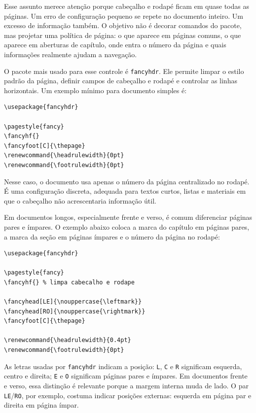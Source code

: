 Esse assunto merece atenção porque cabeçalho e rodapé ficam em quase todas as páginas. Um erro de configuração pequeno se repete no documento inteiro. Um excesso de informação também. O objetivo não é decorar comandos do pacote, mas projetar uma política de página: o que aparece em páginas comuns, o que aparece em aberturas de capítulo, onde entra o número da página e quais informações realmente ajudam a navegação.

O pacote mais usado para esse controle é \texttt{fancyhdr}. Ele permite limpar o estilo padrão da página, definir campos de cabeçalho e rodapé e controlar as linhas horizontais. Um exemplo mínimo para documento simples é:

\begin{lstlisting}[language={[latex]TeX}, caption={Rodapé simples com número de página}]
\usepackage{fancyhdr}

\pagestyle{fancy}
\fancyhf{}
\fancyfoot[C]{\thepage}
\renewcommand{\headrulewidth}{0pt}
\renewcommand{\footrulewidth}{0pt}
\end{lstlisting}

Nesse caso, o documento usa apenas o número da página centralizado no rodapé. É uma configuração discreta, adequada para textos curtos, listas e materiais em que o cabeçalho não acrescentaria informação útil.

Em documentos longos, especialmente frente e verso, é comum diferenciar páginas pares e ímpares. O exemplo abaixo coloca a marca do capítulo em páginas pares, a marca da seção em páginas ímpares e o número da página no rodapé:

\begin{lstlisting}[language={[latex]TeX}, caption={Cabeçalho e rodapé com fancyhdr}]
\usepackage{fancyhdr}

\pagestyle{fancy}
\fancyhf{} % limpa cabecalho e rodape

\fancyhead[LE]{\nouppercase{\leftmark}}
\fancyhead[RO]{\nouppercase{\rightmark}}
\fancyfoot[C]{\thepage}

\renewcommand{\headrulewidth}{0.4pt}
\renewcommand{\footrulewidth}{0pt}
\end{lstlisting}

As letras usadas por \texttt{fancyhdr} indicam a posição: \texttt{L}, \texttt{C} e \texttt{R} significam esquerda, centro e direita; \texttt{E} e \texttt{O} significam páginas pares e ímpares. Em documentos frente e verso, essa distinção é relevante porque a margem interna muda de lado. O par \texttt{LE}/\texttt{RO}, por exemplo, costuma indicar posições externas: esquerda em página par e direita em página ímpar.

